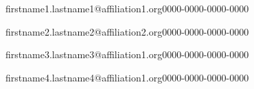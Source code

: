 \author[1,2]{Firstname1 Lastname1}{firstname1.lastname1@affiliation1.org}{0000-0000-0000-0000}
\author[2]{Firstname2 Lastname2}{firstname2.lastname2@affiliation2.org}{0000-0000-0000-0000}
\author[3]{Firstname3 Lastname3}{firstname3.lastname3@affiliation1.org}{0000-0000-0000-0000}
\author[1]{Firstname4 Lastname4}{firstname4.lastname4@affiliation1.org}{0000-0000-0000-0000}%
